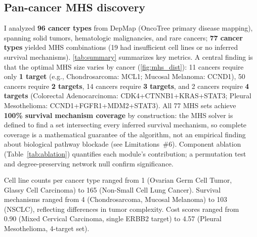 \documentclass[11pt]{article}
\begin{document}
\subsection*{Pan-cancer MHS discovery}
I analyzed \textbf{96 cancer types} from DepMap (OncoTree primary disease mapping), spanning solid tumors, hematologic malignancies, and rare cancers; \textbf{77 cancer types} yielded MHS combinations (19 had insufficient cell lines or no inferred survival mechanisms). \cref{tab:summary} summarizes key metrics. A central finding is that the optimal MHS size varies by cancer (\cref{fig:mhs_dist}): 11 cancers require only \textbf{1 target} (e.g., Chondrosarcoma: MCL1; Mucosal Melanoma: CCND1), 50 cancers require \textbf{2 targets}, 14 cancers require \textbf{3 targets}, and 2 cancers require \textbf{4 targets} (Colorectal Adenocarcinoma: CDK4+CTNNB1+KRAS+STAT3; Pleural Mesothelioma: CCND1+FGFR1+MDM2+STAT3). All 77 MHS sets achieve \textbf{100\% survival mechanism coverage} by construction: the MHS solver is defined to find a set intersecting every inferred survival mechanism, so complete coverage is a mathematical guarantee of the algorithm, not an empirical finding about biological pathway blockade (see Limitations~\#6). Component ablation (Table~\ref{tab:ablation}) quantifies each module's contribution; a permutation test and degree-preserving network null confirm significance.

Cell line counts per cancer type ranged from 1 (Ovarian Germ Cell Tumor, Glassy Cell Carcinoma) to 165 (Non-Small Cell Lung Cancer). Survival mechanisms ranged from 4 (Chondrosarcoma, Mucosal Melanoma) to 103 (NSCLC), reflecting differences in tumor complexity. Cost scores ranged from 0.90 (Mixed Cervical Carcinoma, single ERBB2 target) to 4.57 (Pleural Mesothelioma, 4-target set).
\end{document}
